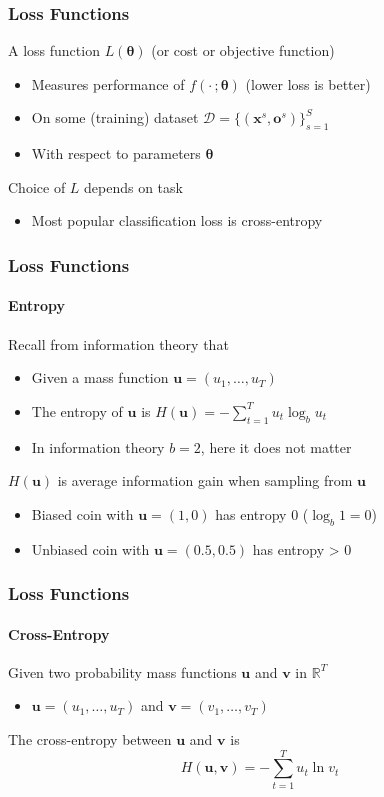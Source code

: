 \documentclass[xetex,professionalfont]{beamer}
\renewcommand\emph[1]{\textcolor{tuwcvl_cvl_blue}{#1}}
\newcommand{\RR}{\mathbb{R}}
\renewcommand{\vec}[1]{\ensuremath{\mathbf{#1}}}
\newcommand{\vu}{\vec{u}}
\newcommand{\vv}{\vec{v}}
\newcommand{\vx}{\vec{x}}
\newcommand{\vo}{\vec{o}}
\newcommand{\bth}{\boldsymbol{\theta}}
\newcommand{\cD}{\mathcal{D}}
\begin{document}
\begin{frame}
  \frametitle{Loss Functions}


A \emph{loss function} $L(\bth)$ (or \emph{cost} or \emph{objective} function) %
\begin{itemize}
    \item Measures performance of $f(\cdot\,;\bth)$ (lower loss is better)
    \item On some (training) dataset $\cD=\{(\vx^s,\vo^s)\}_{s=1}^S$ %
    \item With respect to parameters $\bth$
\end{itemize}

\bigskip

Choice of $L$ depends on task
\begin{itemize}
    \item Most popular classification loss is cross-entropy
\end{itemize}

\end{frame}


\begin{frame}
  \frametitle{Loss Functions}
  \framesubtitle{Entropy}

Recall from information theory that
\begin{itemize}
    \item Given a mass function $\vu=(u_1,\dots,u_T)$
    \item The \emph{entropy} of $\vu$ is $H(\vu)=-\sum_{t=1}^T u_t\log_b u_t$ %
    \item In information theory $b=2$, here it does not matter
\end{itemize}

\bigskip

$H(\vu)$ is average information gain when sampling from $\vu$
\begin{itemize}
    \item Biased coin with $\vu=(1,0)$ has entropy 0 ($\log_b1=0$) %
    \item Unbiased coin with $\vu=(0.5,0.5)$ has entropy > 0
\end{itemize}

\end{frame}


\begin{frame}
  \frametitle{Loss Functions}
  \framesubtitle{Cross-Entropy}

Given two probability mass functions $\vu$ and $\vv$ in $\RR^T$
\begin{itemize}
    \item $\vu=(u_1,\dots,u_T)$ and $\vv=(v_1,\dots,v_T)$
\end{itemize}

\bigskip

The \emph{cross-entropy} between $\vu$ and $\vv$ is %
\[
    H(\vu,\vv)=-\sum_{t=1}^T u_t\ln v_t
\]

\end{frame}
\end{document}

